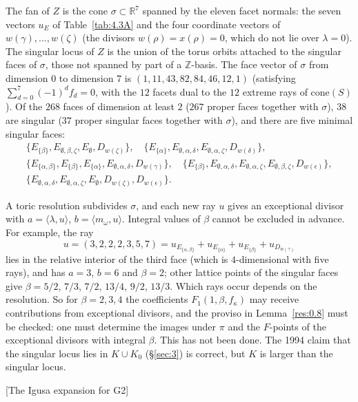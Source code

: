\documentclass[12pt,letterpaper]{amsart}
\theoremstyle{plain}
\theoremstyle{definition}
\theoremstyle{remark}
\theoremstyle{definition}
\newcommand{\zzz}{\mathbb{Z}}
\newcommand{\rrr}{\mathbb{R}}
\begin{document}
\begin{rem26}\label{rem:exceptional}
The fan of $Z$ is the cone $\sigma\subset\rrr^7$ spanned by the eleven facet
normals: the seven vectors $u_E$ of Table~\ref{tab:4.3A} and the four
coordinate vectors of $w(\gamma),\dots,w(\zeta)$ (the divisors
$w(\rho)=x(\rho)=0$, which do not lie over $\lambda=0$). The singular locus
of $Z$ is the union of the torus orbits attached to the singular faces of
$\sigma$, those not spanned by part of a $\zzz$-basis. The face vector of $\sigma$ from dimension $0$ to dimension $7$ is
$(1,11,43,82,84,46,12,1)$ (satisfying $\sum_{d=0}^7(-1)^d f_d=0$, with the $12$
facets dual to the $12$ extreme rays of $\mathrm{cone}(S)$). Of the $268$ faces
of dimension at least $2$ ($267$ proper faces together with $\sigma$), $38$ are
singular ($37$ proper singular faces together with $\sigma$), and there are five
minimal singular faces:
\[
\begin{gathered}
\{E_{\{\beta\}},E_{\emptyset,\beta,\zeta},E_\emptyset,D_{w(\zeta)}\},\quad
\{E_{\{\alpha\}},E_{\emptyset,\alpha,\delta},E_{\emptyset,\alpha,\zeta},D_{w(\delta)}\},\\
\{E_{\{\alpha,\beta\}},E_{\{\beta\}},E_{\{\alpha\}},E_{\emptyset,\alpha,\delta},D_{w(\gamma)}\},\quad
\{E_{\{\beta\}},E_{\emptyset,\alpha,\delta},E_{\emptyset,\alpha,\zeta},E_{\emptyset,\beta,\zeta},D_{w(\epsilon)}\},\\
\{E_{\emptyset,\alpha,\delta},E_{\emptyset,\alpha,\zeta},E_\emptyset,D_{w(\zeta)},D_{w(\epsilon)}\}.
\end{gathered}
\]

A toric resolution subdivides $\sigma$, and each new ray $u$ gives an
exceptional divisor with $a=\langle\lambda,u\rangle$, $b=\langle
m_\omega,u\rangle$. Integral values of $\beta$ cannot be excluded in advance.
For example, the ray
\[
u=(3,2,2,2,3,5,7)=u_{E_{\{\alpha,\beta\}}}+u_{E_{\{\alpha\}}}
+u_{E_{\{\beta\}}}+u_{D_{w(\gamma)}}
\]
lies in the relative interior of the
third face (which is $4$-dimensional with five rays), and has $a=3$, $b=6$ and $\beta=2$; other lattice points of the singular
faces give $\beta=5/2$, $7/3$, $7/2$, $13/4$, $9/2$, $13/3$. Which rays occur
depends on the resolution. So for $\beta=2,3,4$ the coefficients $F_1(1,\beta,
f_\kappa)$ may receive contributions from exceptional divisors, and the
proviso in Lemma~\ref{res:0.8} must be checked: one must determine the images
under $\pi$ and the $F$-points of the exceptional divisors with integral
$\beta$. This has not been done. The 1994 claim that the singular locus lies
in $K\cup K_0$ (\S\ref{sec:3}) is correct, but $K$ is larger than the singular
locus.
\end{rem26}
[The Igusa expansion for G2]\label{sec:5}
\end{document}
